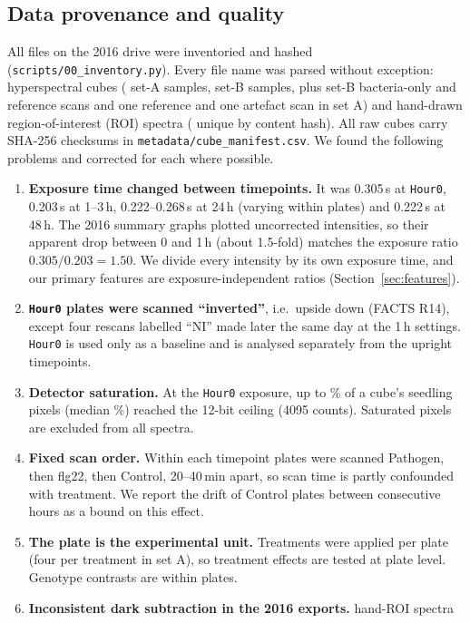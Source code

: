 \subsection{Data provenance and quality}\label{sec:quality}
All \nFiles{} files on the 2016 drive were inventoried and hashed (\texttt{scripts/00\_inventory.py}).
Every file name was parsed without exception: \nCubes{} hyperspectral cubes (\nCubesA{} set-A
samples, \nCubesB{} set-B samples, plus set-B bacteria-only and reference scans and one reference
and one artefact scan in set A) and \nRoiFiles{} hand-drawn region-of-interest (ROI) spectra
(\nRoiUnique{} unique by content hash). All \nShaRaw{} raw cubes carry SHA-256 checksums in
\texttt{metadata/cube\_manifest.csv}. We found the following problems and corrected for each where possible.
\begin{enumerate}
  \item \textbf{Exposure time changed between timepoints.} It was 0.305\,s at \texttt{Hour0},
  0.203\,s at 1--3\,h, 0.222--0.268\,s at 24\,h (varying within plates) and 0.222\,s at 48\,h.
  The 2016 summary graphs plotted uncorrected intensities, so their apparent drop between 0 and
  1\,h (about 1.5-fold) matches the exposure ratio $0.305/0.203=1.50$. We divide every intensity
  by its own exposure time, and our primary features are exposure-independent ratios
  (Section~\ref{sec:features}).
  \item \textbf{\texttt{Hour0} plates were scanned ``inverted''}, i.e.\ upside down (FACTS R14), except four
  rescans labelled ``NI'' made later the same day at the 1\,h settings. \texttt{Hour0} is used
  only as a baseline and is analysed separately from the upright timepoints.
  \item \textbf{Detector saturation.} At the \texttt{Hour0} exposure, up to
  \satHzeroMaxPct\% of a cube's seedling pixels (median \satHzeroMedPct\%) reached the 12-bit ceiling
  (4095 counts). Saturated pixels
  are excluded from all spectra.
  \item \textbf{Fixed scan order.} Within each timepoint plates were scanned Pathogen, then
  flg22, then Control, 20--40\,min apart, so scan time is partly confounded with treatment. We
  report the drift of Control plates between consecutive hours as a bound on this effect.
  \item \textbf{The plate is the experimental unit.} Treatments were applied per plate (four per
  treatment in set A), so treatment effects are tested at plate level. Genotype contrasts are
  within plates.
  \item \textbf{Inconsistent dark subtraction in the 2016 exports.} \nOffsetRoi{} hand-ROI spectra

\end{enumerate}
